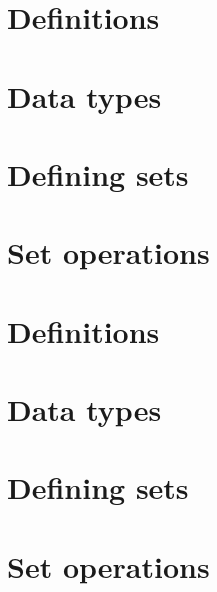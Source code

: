 
\section*{Definitions}

\vfill
\section*{Data types}

\vfill
\section*{Defining sets}

\vfill
\section*{Set operations}

\vfill
\section*{Definitions}

\vfill
\section*{Data types}

\vfill
\section*{Defining sets}

\vfill
\section*{Set operations}

\vfill
